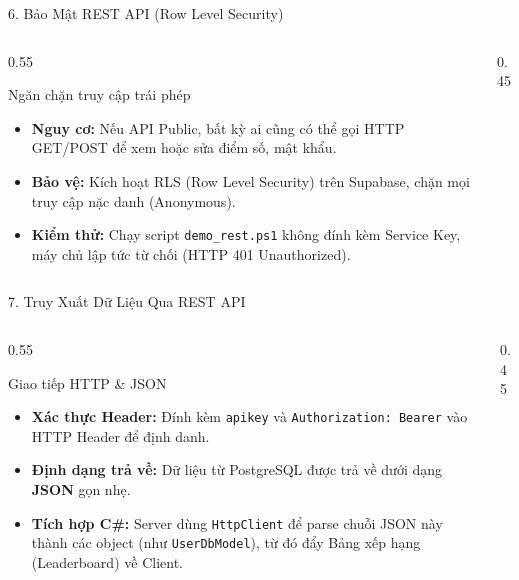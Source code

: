 \begin{frame}{6. Bảo Mật REST API (Row Level Security)}
\begin{columns}
\begin{column}{0.55\textwidth}
\begin{alertblock}{Ngăn chặn truy cập trái phép}
\begin{itemize}
\item \textbf{Nguy cơ:} Nếu API Public, bất kỳ ai cũng có thể gọi HTTP GET/POST để xem hoặc sửa điểm số, mật khẩu.
\item \textbf{Bảo vệ:} Kích hoạt RLS (Row Level Security) trên Supabase, chặn mọi truy cập nặc danh (Anonymous).
\item \textbf{Kiểm thử:} Chạy script \texttt{demo_rest.ps1} không đính kèm Service Key, máy chủ lập tức từ chối (HTTP 401 Unauthorized).
\end{itemize}
\end{alertblock}
\end{column}
\begin{column}{0.45\textwidth}
\centering
{}
\end{column}
\end{columns}
\end{frame}

\begin{frame}{7. Truy Xuất Dữ Liệu Qua REST API}
\begin{columns}
\begin{column}{0.55\textwidth}
\begin{exampleblock}{Giao tiếp HTTP & JSON}
\begin{itemize}
\item \textbf{Xác thực Header:} Đính kèm \texttt{apikey} và \texttt{Authorization: Bearer} vào HTTP Header để định danh.
\item \textbf{Định dạng trả về:} Dữ liệu từ PostgreSQL được trả về dưới dạng \textbf{JSON} gọn nhẹ.
\item \textbf{Tích hợp C#:} Server dùng \texttt{HttpClient} để parse chuỗi JSON này thành các object (như \texttt{UserDbModel}), từ đó đẩy Bảng xếp hạng (Leaderboard) về Client.
\end{itemize}
\end{exampleblock}
\end{column}
\begin{column}{0.45\textwidth}
\centering
{}
\end{column}
\end{columns}
\end{frame}